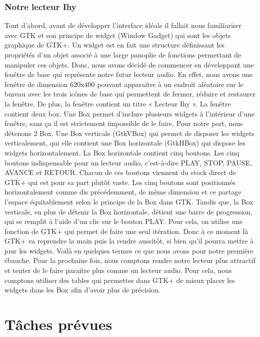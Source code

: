 \documentclass[a4paper,12pt]{article}
\begin{document}
		\subsubsection{Notre lecteur Ihy}
Tout d'abord, avant de développer l'interface idéale il fallait nous
familiariser avec GTK et son principe de widget (Window Gadget) qui sont les
objets graphique de GTK+. Un widget est en fait une structure définissant les
propriétés d'un objet associé à une large panoplie de fonctions permettant de
manipuler ces objets. Donc, nous avons décidé de commencer en développant une
fenêtre de base qui représente notre futur lecteur audio. En effet, nous avons
une fenêtre de dimension 620x400 pouvant apparaitre à un endroit aléatoire sur
le bureau avec les trois icônes de base qui permettent de fermer, réduire et
restaurer la fenêtre. De plus, la fenêtre contient un titre « Lecteur Ihy ».  La
fenêtre contient deux box. Une Box permet d'inclure plusieurs widgets à
l'intérieur d'une fenêtre, sans ça il est strictement impossible de le faire.
Pour notre part, nous détenons 2 Box. Une Box verticale (GtkVBox) qui permet de
disposer les widgets verticalement, qui elle contient une Box horizontale
(GtkHBox) qui dispose les widgets horizontalement. La Box horizontale contient
cinq boutons. Les cinq boutons indispensable pour un lecteur audio, c'est-à-dire
PLAY, STOP, PAUSE, AVANCE et RETOUR. Chacun de ces boutons viennent du stock
direct de GTK+ qui est pour sa part plutôt vaste. Les cinq boutons sont
positionnés horizontalement comme dis précédemment, de même dimension et ce
partage l'espace équitablement selon le principe de la Box dans GTK.  Tandis
que, la Box verticale, en plus de détenir la Box horizontale, détient une barre
de progression, qui se remplit à l'aide d'un clic sur le bouton PLAY. Pour
cela, on utilise une fonction de GTK+ qui permet de faire une seul itération.
Donc à ce moment là GTK+ va reprendre la main puis la rendre aussitôt, si bien
qu’il pourra mettre à jour les widgets.  Voilà en quelques termes ce que
nous avons pour notre première ébauche. Pour la prochaine fois, nous comptons
rendre notre lecteur plus attractif et tenter de le faire paraitre plus comme un
lecteur audio. Pour cela, nous comptons utiliser des tables qui permettes dans
GTK+ de mieux placer les widgets dans les Box afin d'avoir plus de précision. 

\section{Tâches prévues}
\end{document}
